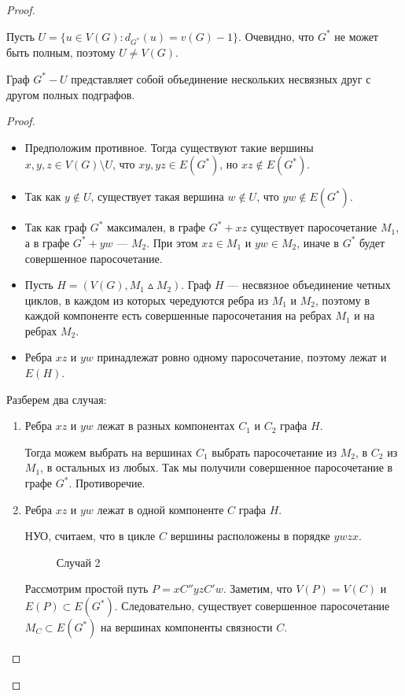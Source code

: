 \begin{proof}
\begin{description}
			Пусть $U = \{u \in V(G) \colon d_{G^*}(u) = v(G) -1\}$. Очевидно, что $G^*$ не может быть полным, поэтому $U \neq V(G)$.
			\begin{lemma}\label{lm:matching_2}
				Граф $G^* - U$ представляет собой объединение нескольких несвязных друг с другом полных подграфов.
			\end{lemma}
			\begin{proof}
			    \begin{itemize}
					\item Предположим противное. Тогда существуют такие вершины $x, y, z \in V(G) \setminus U$, что $xy, yz \in E(G^*)$, но $xz \notin E(G^*)$.
					\item Так как $y \notin U$, существует такая вершина $w \notin U$,  что $yw \notin E(G^*)$.
					\item Так как граф $G^*$ максимален, в графе $G^*+xz$ существует паросочетание $M_1$, а в графе $G^* + yw$ --- $M_2$. При этом $xz \in M_1$ и $yw \in M_2$, иначе в $G^*$ будет совершенное паросочетание.
					\item Пусть $H = (V(G), M_1 \vartriangle M_2)$. Граф  $H$ --- несвязное объединение четных циклов, в каждом из которых чередуются ребра из $M_1$ и $M_2$, поэтому в каждой компоненте есть совершенные паросочетания на ребрах $M_1$ и на ребрах $M_2$.
					\item Ребра $xz$ и $yw$ принадлежат ровно одному паросочетание, поэтому лежат и  $E(H)$.
			    \end{itemize}
				Разберем два случая:
				\begin{enumerate}
					\item Ребра $xz$ и $yw$ лежат в разных компонентах $C_1$ и $C_2$ графа $H$.

						Тогда можем выбрать на вершинах $C_1$ выбрать паросочетание из $M_2$, в $C_2$ из $M_1$, в остальных из любых. Так мы получили совершенное паросочетание в графе $G^*$. Противоречие. 
					\item Ребра $xz$ и $yw$ лежат в одной компоненте $C$ графа $H$.

						НУО, считаем, что в цикле $C$ вершины расположены в порядке $ywzx$.
\begin{figure}[ht]
    \centering
    \caption{Случай 2}
    \label{fig:tutta-thm}
\end{figure}
					Рассмотрим простой путь $P=xC''yzC'w$. Заметим, что $V(P) = V(C)$ и $E(P) \subset E(G^*)$. Следовательно, существует совершенное паросочетание $M_C \subset E(G^*)$ на вершинах компоненты связности $C$.


\end{enumerate}
\end{proof}
\end{description}
\end{proof}
